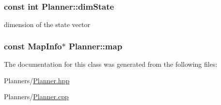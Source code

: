\subsubsection[{\texorpdfstring{dim\+State}{dimState}}]{\setlength{\rightskip}{0pt plus 5cm}const int Planner\+::dim\+State\hspace{0.3cm}{\ttfamily [protected]}}\hypertarget{classPlanner_a70081990e0749d5347190d37022c30f1}{}\label{classPlanner_a70081990e0749d5347190d37022c30f1}
dimension of the state vector 
\subsubsection[{\texorpdfstring{map}{map}}]{\setlength{\rightskip}{0pt plus 5cm}const {\bf Map\+Info}$\ast$ Planner\+::map\hspace{0.3cm}{\ttfamily [protected]}}\hypertarget{classPlanner_ab651f7a11072a2588bbb7683660b519e}{}\label{classPlanner_ab651f7a11072a2588bbb7683660b519e}


The documentation for this class was generated from the following files\+:\begin{DoxyCompactItemize}
\item 
Planners/\hyperlink{Planner_8hpp}{Planner.\+hpp}\item 
Planners/\hyperlink{Planner_8cpp}{Planner.\+cpp}\end{DoxyCompactItemize}
